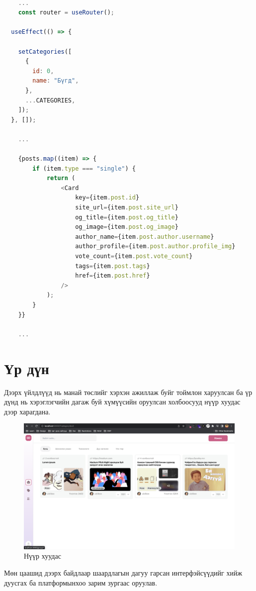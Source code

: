 \begin{lstlisting}[language=Javascript, caption=Card компонентод ирсэн утгуудыг props-оор дамжуулж DOM дээр рендерлэх, frame=single]
	
	...
	const router = useRouter();

  useEffect(() => {
  
    setCategories([
      {
        id: 0,
        name: "Бүгд",
      },
      ...CATEGORIES,
    ]);
  }, []);

	... 

	{posts.map((item) => {
		if (item.type === "single") {
			return (
				<Card
					key={item.post.id}
					site_url={item.post.site_url}
					og_title={item.post.og_title}
					og_image={item.post.og_image}
					author_name={item.post.author.username}
					author_profile={item.post.author.profile_img}
					vote_count={item.post.vote_count}
					tags={item.post.tags}
					href={item.post.href}
				/>
			);
		}
	}}

	...

\end{lstlisting}

\section{Үр дүн}

Дээрх үйлдлүүд нь манай төслийг хэрхэн ажиллаж буйг тоймлон харуулсан ба үр дүнд нь хэрэглэгчийн дагаж буй хүмүүсийн оруулсан холбоосууд нүүр хуудас дээр харагдана. 

\begin{figure}[h]
	\centering
	\includegraphics[width=13cm]{images/implement/home-page.png}
	\caption{Нүүр хуудас}
	\label{fig:home-page}
\end{figure}

Мөн цаашид дээрх байдлаар шаардлагын дагуу гарсан интерфэйсүүдийг хийж дуусгах ба платформынхоо зарим зургаас оруулав.

